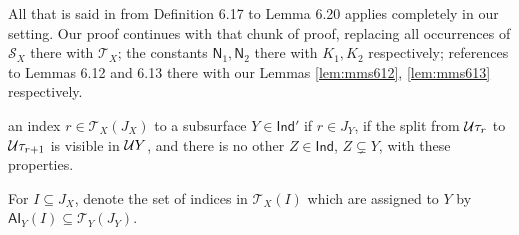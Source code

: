 All that is said in \cite{mms} from Definition 6.17 to Lemma 6.20 applies completely in our setting. Our proof continues with that chunk of proof, replacing all occurrences of $\mathcal S_X$ there with $\mathcal T_X$; the constants $\mathsf{N}_1,\mathsf{N}_2$ there with $K_1,K_2$ respectively; references to Lemmas 6.12 and 6.13 there with our Lemmas \ref{lem:mms612}, \ref{lem:mms613} respectively.

\begin{defin}
 an index $r\in \mathcal T_X(J_X)$ to a subsurface $Y\in \mathsf{Ind}'$ if $r\in J_Y$, if the split from ${\mathcal U}\tau_r$ to ${\mathcal U} \tau_{r+1}$ is visible in ${\mathcal U} Y$, and there is no other $Z\in \mathsf{Ind}$, $Z\subsetneq Y$, with these properties.

For $I\subseteq J_X$, denote the set of indices in $\mathcal T_X(I)$ which are assigned to $Y$ by $\mathsf{AI}_Y(I)\subseteq \mathcal T_Y(J_Y)$.
\end{defin}

